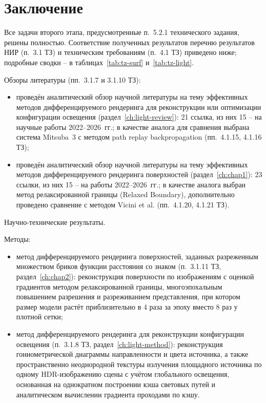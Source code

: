 \chapter*{Заключение}
\label{ch:conclusion}

Все задачи второго этапа, предусмотренные п.~5.2.1 технического задания, решены полностью. Соответствие полученных результатов перечню результатов НИР (п.~3.1 ТЗ) и техническим требованиям (п.~4.1 ТЗ) приведено ниже; подробные сводки -- в таблицах~\ref{tab:tz-surf} и~\ref{tab:tz-light}.

Обзоры литературы (пп.~3.1.7 и 3.1.10 ТЗ):
\begin{itemize}
    \item проведён аналитический обзор научной литературы на тему эффективных методов дифференцируемого рендеринга для реконструкции или оптимизации конфигурации освещения (раздел~\ref{ch:light-review}): 21 ссылка, из них 15 -- на научные работы 2022--2026~гг.; в качестве аналога для сравнения выбрана система Mitsuba~3 с методом path replay backpropagation (пп.~4.1.15, 4.1.16 ТЗ);
    \item проведён аналитический обзор научной литературы на тему эффективных методов дифференцируемого рендеринга поверхностей (раздел~\ref{ch:chap1}): 23 ссылки, из них 15 -- на работы 2022--2026~гг.; в качестве аналога выбран метод релаксированной границы (Relaxed Boundary), дополнительно проведено сравнение с методом Vicini et al. (пп.~4.1.20, 4.1.21 ТЗ).
\end{itemize}

Научно-технические результаты.

Методы:
\begin{itemize}
    \item метод дифференцируемого рендеринга поверхностей, заданных разреженным множеством бриков функции расстояния со знаком (п.~3.1.11 ТЗ, раздел~\ref{ch:chap2}): реконструкция поверхности по изображениям с оценкой градиентов методом релаксированной границы, многоэпохальным повышением разрешения и разреживанием представления, при котором размер модели растёт приблизительно в 4 раза за эпоху вместо 8 раз у плотной сетки;
    \item метод дифференцируемого рендеринга для реконструкции конфигурации освещения (п.~3.1.8 ТЗ, раздел~\ref{ch:light-method}): реконструкция гониометрической диаграммы направленности и цвета источника, а также пространственно неоднородной текстуры излучения площадного источника по одному HDR-изображению сцены с учётом глобального освещения, основанная на однократном построении кэша световых путей и аналитическом вычислении градиента проходами по кэшу.
\end{itemize}

